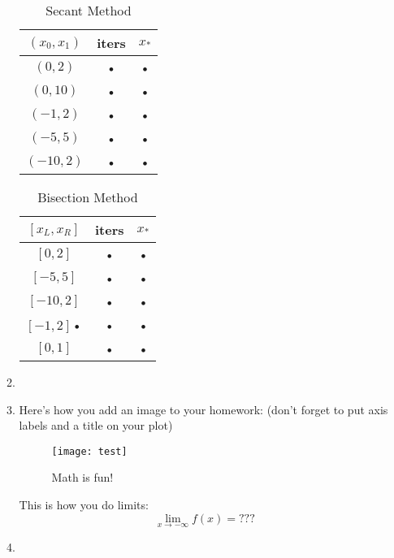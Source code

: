 \documentclass[11pt]{article}
\begin{document}
\begin{enumerate}
\begin{enumerate}
	\begin{table}[H]
	\begin{center}
	\begin{tabular}{|c|c|c|}
	\hline 
	$(x_0, x_1)$ & iters & $x_*$ \\ 
	\hline 
	$(0,2)$ & • & • \\ 
	\hline 
	$(0,10)$ & • & • \\ 
	\hline 
	$(-1, 2)$ & • & • \\ 
	\hline 
	$(-5, 5)$ & • & • \\ 
	\hline 
	$(-10,2)$ & • & • \\ 
	\hline 
	\end{tabular} 
	\caption{Secant Method}
	\end{center}
	\end{table}
	
	
	
	\begin{table}[H]
	\begin{center}
	\begin{tabular}{|c|c|c|}
	\hline 
	$[x_L, x_R]$ & iters & $x_*$ \\ 
	\hline 
	$[0,2]$ & • & • \\ 
	\hline 
	$[-5,5]$ & • & • \\ 
	\hline 
	$[-10,2]$ & • & • \\ 
	\hline 
    $[-1,2]$• & • & • \\ 
	\hline 
	$[0,1]$ & • & • \\ 
	\hline 
	\end{tabular} 
	\caption{Bisection Method}
	\end{center}
	\end{table}



\item 
\item Here's how you add an image to your homework: (don't forget to put axis labels and a title on your plot) \\

\begin{figure}[H]
\begin{center}
\texttt{[image: test]}
\end{center}
\caption{Math is fun!}
\end{figure}

This is how you do limits: 
\begin{equation*}
\lim_{x \to - \infty} f(x) = ???
\end{equation*}

\item 
\end{enumerate}


\end{enumerate}
\end{document}
